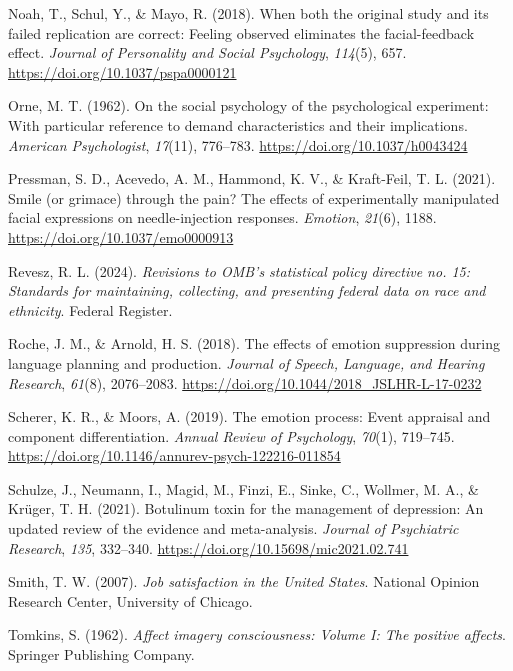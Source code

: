 \documentclass[
  letterpaper,
  DIV=11,
  numbers=noendperiod]{scrartcl}
\newlength{\cslhangindent}
\newenvironment{CSLReferences}[2] %
 {\begin{list}{}{%
  \setlength{\itemindent}{0pt}
  \setlength{\leftmargin}{0pt}
  \setlength{\parsep}{0pt}
  \ifodd #1
   \setlength{\leftmargin}{\cslhangindent}
   \setlength{\itemindent}{-1\cslhangindent}
  \fi
  \setlength{\itemsep}{#2\baselineskip}}}
 {\end{list}}
\begin{document}
\begin{CSLReferences}{1}{0}
Noah, T., Schul, Y., \& Mayo, R. (2018). When both the original study
and its failed replication are correct: Feeling observed eliminates the
facial-feedback effect. \emph{Journal of Personality and Social
Psychology}, \emph{114}(5), 657.
\url{https://doi.org/10.1037/pspa0000121}

Orne, M. T. (1962). On the social psychology of the psychological
experiment: With particular reference to demand characteristics and
their implications. \emph{American Psychologist}, \emph{17}(11),
776--783. \url{https://doi.org/10.1037/h0043424}

Pressman, S. D., Acevedo, A. M., Hammond, K. V., \& Kraft-Feil, T. L.
(2021). Smile (or grimace) through the pain? The effects of
experimentally manipulated facial expressions on needle-injection
responses. \emph{Emotion}, \emph{21}(6), 1188.
\url{https://doi.org/10.1037/emo0000913}

Revesz, R. L. (2024). \emph{Revisions to {OMB}'s statistical policy
directive no. 15: Standards for maintaining, collecting, and presenting
federal data on race and ethnicity}. Federal Register.

Roche, J. M., \& Arnold, H. S. (2018). The effects of emotion
suppression during language planning and production. \emph{Journal of
Speech, Language, and Hearing Research}, \emph{61}(8), 2076--2083.
\url{https://doi.org/10.1044/2018_JSLHR-L-17-0232}

Scherer, K. R., \& Moors, A. (2019). The emotion process: Event
appraisal and component differentiation. \emph{Annual Review of
Psychology}, \emph{70}(1), 719--745.
\url{https://doi.org/10.1146/annurev-psych-122216-011854}

Schulze, J., Neumann, I., Magid, M., Finzi, E., Sinke, C., Wollmer, M.
A., \& Krüger, T. H. (2021). Botulinum toxin for the management of
depression: An updated review of the evidence and meta-analysis.
\emph{Journal of Psychiatric Research}, \emph{135}, 332--340.
\url{https://doi.org/10.15698/mic2021.02.741}

Smith, T. W. (2007). \emph{Job satisfaction in the {United States}}.
National Opinion Research Center, University of Chicago.

Tomkins, S. (1962). \emph{Affect imagery consciousness: Volume {I}: The
positive affects}. Springer Publishing Company.


\end{CSLReferences}
\end{document}
